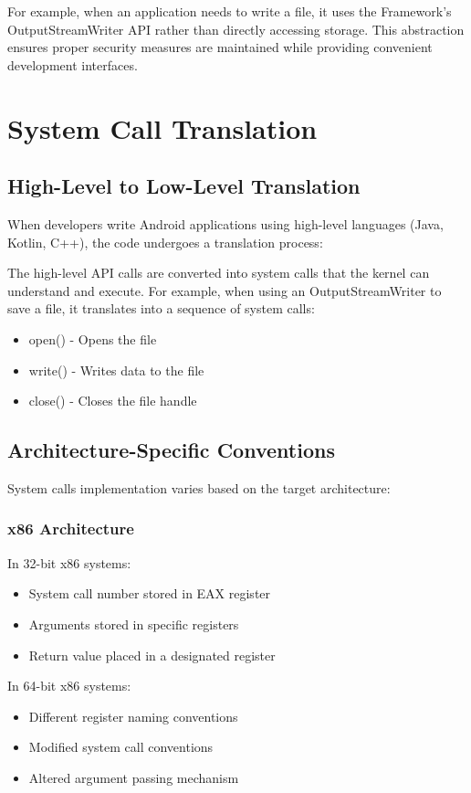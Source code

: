 \documentclass{article}
\begin{document}
For example, when an application needs to write a file, it uses the Framework's OutputStreamWriter API rather than directly accessing storage. This abstraction ensures proper security measures are maintained while providing convenient development interfaces.

\section{System Call Translation}
\subsection{High-Level to Low-Level Translation}
When developers write Android applications using high-level languages (Java, Kotlin, C++), the code undergoes a translation process:

The high-level API calls are converted into system calls that the kernel can understand and execute. For example, when using an OutputStreamWriter to save a file, it translates into a sequence of system calls:
\begin{itemize}
    \item open() - Opens the file
    \item write() - Writes data to the file
    \item close() - Closes the file handle
\end{itemize}

\subsection{Architecture-Specific Conventions}
System calls implementation varies based on the target architecture:

\subsubsection{x86 Architecture}
In 32-bit x86 systems:
\begin{itemize}
    \item System call number stored in EAX register
    \item Arguments stored in specific registers
    \item Return value placed in a designated register
\end{itemize}

In 64-bit x86 systems:
\begin{itemize}
    \item Different register naming conventions
    \item Modified system call conventions
    \item Altered argument passing mechanism
\end{itemize}
\end{document}
